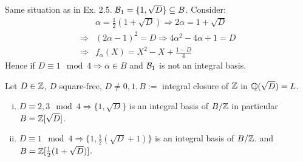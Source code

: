 
\begin{Bsp}
Same situation as in Ex. 2.5. $\mathcal{B}_1=\{1, \sqrt{D}\} \subseteq B$. Consider:
\begin{align*}
&\alpha = \frac{1}{2}(1+ \sqrt{D}) \Rightarrow 2 \alpha = 1+ \sqrt{D}\\
\Rightarrow & (2\alpha-1)^2=D \Rightarrow 4 \alpha^2-4\alpha+1=D\\
\Rightarrow & f_\alpha(X)=X^2-X+\frac{1-D}{4}
\end{align*}
Hence if $D \equiv 1 \mod 4 \Rightarrow \alpha \in B$ and $\mathcal{B}_1$ is not an integral basis.
\end{Bsp}

\begin{Prop}
Let $D \in \mathbb{Z}$, $D$ square-free, $D \not = 0,1, B:= $ integral closure of $\mathbb{Z}$ in $\mathbb{Q}(\sqrt{D})=L$.
\begin{enumerate}[i)]
\item $D \equiv 2,3 \mod 4 \Rightarrow \{1, \sqrt{D}\}$ is an integral basis of $B / \mathbb{Z}$ in particular $B= \mathbb{Z}[\sqrt{D}]$.
\item $D \equiv 1 \mod 4 \Rightarrow \{1, \frac{1}{2}(\sqrt{D}+1)\}$ is an integral basis of $B / \mathbb{Z}$. and $B = \mathbb{Z}[\frac{1}{2} (1+\sqrt{D})]$.
\end{enumerate}
\end{Prop}

